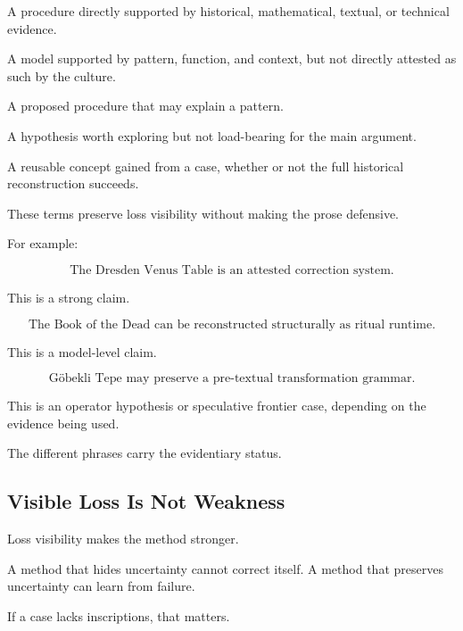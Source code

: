 \documentclass[11pt]{book}
\begin{document}
\begin{description}[leftmargin=2.8cm, style=nextline]
    \item[Attested procedure]
    A procedure directly supported by historical, mathematical, textual, or technical evidence.

    \item[Structural reconstruction]
    A model supported by pattern, function, and context, but not directly attested as such by the culture.

    \item[Operator hypothesis]
    A proposed procedure that may explain a pattern.

    \item[Speculative frontier]
    A hypothesis worth exploring but not load-bearing for the main argument.

    \item[Extracted primitive]
    A reusable concept gained from a case, whether or not the full historical reconstruction succeeds.
\end{description}

These terms preserve loss visibility without making the prose defensive.

For example:

\[
\text{The Dresden Venus Table is an attested correction system.}
\]

This is a strong claim.

\[
\text{The Book of the Dead can be reconstructed structurally as ritual runtime.}
\]

This is a model-level claim.

\[
\text{Göbekli Tepe may preserve a pre-textual transformation grammar.}
\]

This is an operator hypothesis or speculative frontier case, depending on the evidence being used.

The different phrases carry the evidentiary status.

\subsection{Visible Loss Is Not Weakness}

Loss visibility makes the method stronger.

A method that hides uncertainty cannot correct itself. A method that preserves uncertainty can learn from failure.

If a case lacks inscriptions, that matters.
\end{document}
